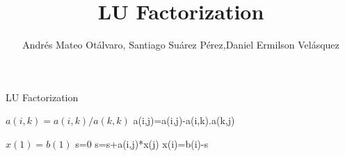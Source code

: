 \documentclass{article}
\title{LU Factorization}
\author{Andrés Mateo Otálvaro, Santiago Suárez Pérez,Daniel Ermilson Velásquez}
\begin{document}
\maketitle
\begin{algorithm}
\caption{LU Factorization}\label{numerical methods}
\begin{algorithmic}[1]
    \State $a(i,k)=a(i,k)/a(k,k)$
      \State a(i,j)=a(i,j)-a(i,k).a(k,j)
     \EndFor
    \EndFor    
  \EndFor

  \State $x(1)=b(1)$
     \State s=0
       \State s=s+a(i,j)*x(j)
      \EndFor
     \State x(i)=b(i)-s
   \EndFor  
\EndProcedure
\end{algorithmic}
\end{algorithm}
\end{document}
